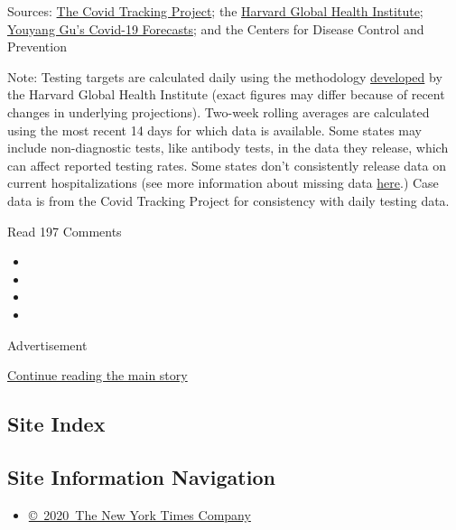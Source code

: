 Sources: \href{https://covidtracking.com/}{The Covid Tracking Project};
the
\href{https://globalepidemics.org/july-6-2020-state-testing-targets/}{Harvard
Global Health Institute};
\href{https://github.com/youyanggu/covid19_projections}{Youyang Gu's
Cov}\href{https://github.com/youyanggu/covid19_projections}{id}\href{https://github.com/youyanggu/covid19_projections}{-19
Forecasts}; and the Centers for Disease Control and Prevention

Note: Testing targets are calculated daily using the methodology
\href{https://globalepidemics.org/july-6-2020-state-testing-targets/}{developed}
by the Harvard Global Health Institute (exact figures may differ because
of recent changes in underlying projections). Two-week rolling averages
are calculated using the most recent 14 days for which data is
available. Some states may include non-diagnostic tests, like antibody
tests, in the data they release, which can affect reported testing
rates. Some states don't consistently release data on current
hospitalizations (see more information about missing data
\href{https://covidtracking.com/data}{here}.) Case data is from the
Covid Tracking Project for consistency with daily testing data.

Read 197 Comments

\begin{itemize}
\item
\item
\item
\item
\end{itemize}

Advertisement

\protect\hyperlink{after-bottom}{Continue reading the main story}

\hypertarget{site-index}{%
\subsection{Site Index}\label{site-index}}

\hypertarget{site-information-navigation}{%
\subsection{Site Information
Navigation}\label{site-information-navigation}}

\begin{itemize}
\tightlist
\item
  \href{https://help.nytimes3xbfgragh.onion/hc/en-us/articles/115014792127-Copyright-notice}{©~2020~The
  New York Times Company}
\end{itemize}

